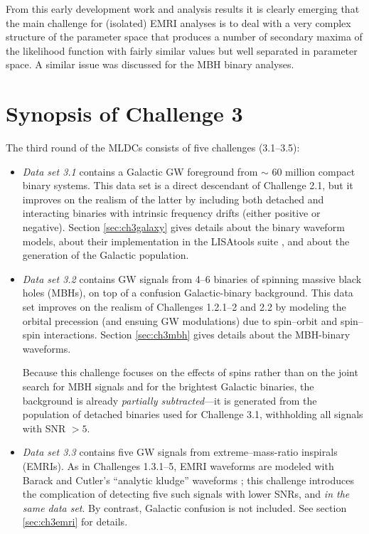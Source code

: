 \documentclass{iopart}
\begin{document}
From this early development work and analysis results it is clearly emerging that the main challenge for (isolated) EMRI analyses is to deal with a very complex structure of the parameter space that produces a number of secondary maxima of the likelihood function with fairly similar values but well separated in parameter space. A similar issue was discussed for the MBH binary analyses.

\section{Synopsis of Challenge 3}
\label{s:challenge-3}

The third round of the MLDCs consists of five challenges (3.1--3.5):
%
\begin{itemize}
%
\item \textit{Data set 3.1} contains a Galactic GW foreground from $\sim$ 60 million compact binary systems.
This data set is a direct descendant of Challenge 2.1, but it improves on the realism of the latter by including both detached and interacting binaries with intrinsic frequency drifts (either positive or negative). Section \ref{sec:ch3galaxy} gives details about the binary waveform models, about their implementation in the LISAtools suite \cite{lisatools}, and about the generation of the Galactic population. 
%
\item \textit{Data set 3.2} contains GW signals from 4--6 binaries of spinning massive black holes (MBHs), on top of a confusion Galactic-binary background. This data set improves on the realism of Challenges 1.2.1--2 and 2.2 by modeling the orbital precession (and ensuing GW modulations) due to spin--orbit and spin--spin interactions. Section \ref{sec:ch3mbh} gives details about the MBH-binary waveforms.

Because this challenge focuses on the effects of spins rather than on the joint search for MBH signals and for the brightest Galactic binaries, the background is already \emph{partially subtracted}---it is generated from the population of detached binaries used for Challenge 3.1, withholding all signals with SNR $> 5$.
%
\item \textit{Data set 3.3} contains five GW signals from extreme--mass-ratio inspirals (EMRIs). As in Challenges 1.3.1--5, EMRI waveforms are modeled with Barack and Cutler's ``analytic kludge'' waveforms \cite{barackcutler}; this challenge introduces the complication of detecting five such signals with lower SNRs, and \emph{in the same data set}. By contrast, Galactic confusion is not included. See section \ref{sec:ch3emri} for details.
%
\end{itemize}
\end{document}
